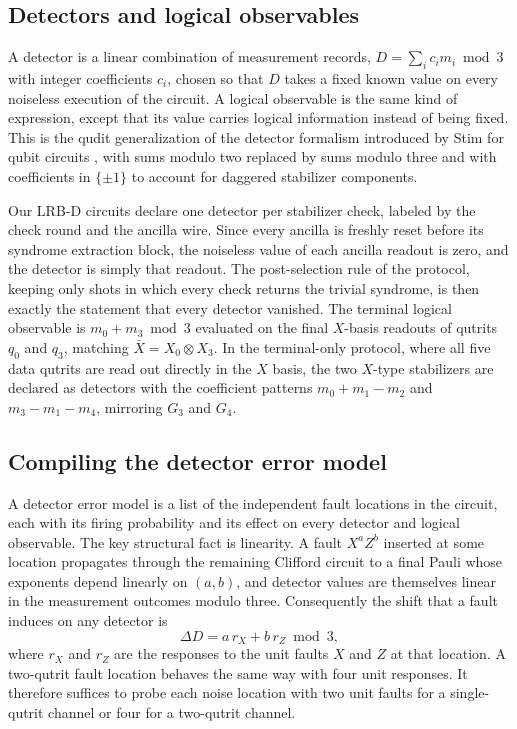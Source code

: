 \subsection{Detectors and logical observables}

A detector is a linear combination of measurement records, $D = \sum_i c_i m_i \bmod 3$ with integer coefficients $c_i$, chosen so that $D$ takes a fixed known value on every noiseless execution of the circuit. A logical observable is the same kind of expression, except that its value carries logical information instead of being fixed. This is the qudit generalization of the detector formalism introduced by Stim for qubit circuits \cite{Gidney2021Stim}, with sums modulo two replaced by sums modulo three and with coefficients in $\{\pm 1\}$ to account for daggered stabilizer components.

Our LRB-D circuits declare one detector per stabilizer check, labeled by the check round and the ancilla wire. Since every ancilla is freshly reset before its syndrome extraction block, the noiseless value of each ancilla readout is zero, and the detector is simply that readout. The post-selection rule of the protocol, keeping only shots in which every check returns the trivial syndrome, is then exactly the statement that every detector vanished. The terminal logical observable is $m_0 + m_3 \bmod 3$ evaluated on the final $X$-basis readouts of qutrits $q_0$ and $q_3$, matching $\bar{X} = X_0 \otimes X_3$. In the terminal-only protocol, where all five data qutrits are read out directly in the $X$ basis, the two $X$-type stabilizers are declared as detectors with the coefficient patterns $m_0 + m_1 - m_2$ and $m_3 - m_1 - m_4$, mirroring $G_3$ and $G_4$.

\subsection{Compiling the detector error model}

A detector error model is a list of the independent fault locations in the circuit, each with its firing probability and its effect on every detector and logical observable. The key structural fact is linearity. A fault $X^a Z^b$ inserted at some location propagates through the remaining Clifford circuit to a final Pauli whose exponents depend linearly on $(a,b)$, and detector values are themselves linear in the measurement outcomes modulo three. Consequently the shift that a fault induces on any detector is
\begin{equation}
    \Delta D = a\, r_X + b\, r_Z \bmod 3,
\end{equation}
where $r_X$ and $r_Z$ are the responses to the unit faults $X$ and $Z$ at that location. A two-qutrit fault location behaves the same way with four unit responses. It therefore suffices to probe each noise location with two unit faults for a single-qutrit channel or four for a two-qutrit channel.

